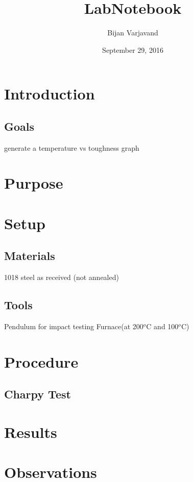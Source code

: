 \documentclass{article}
\author{Bijan Varjavand}
\title{LabNotebook}
\date{September 29, 2016}
\begin{document}
\maketitle

\section{Introduction}

\subsection{Goals}
generate a temperature vs toughness graph

\section{Purpose}

\section{Setup}

\subsection{Materials}
1018 steel as received (not annealed)

\subsection{Tools}
Pendulum for impact testing
Furnace(at 200$^o$C and 100$^o$C)

\section{Procedure}

\subsection{Charpy Test}

\section{Results}

\section{Observations}
\end{document}
